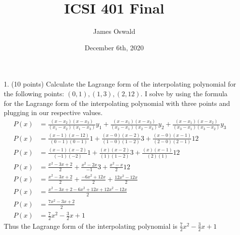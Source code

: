 \documentclass{article}
\author{James Oswald}
\date{December 6th, 2020}
\title{ICSI 401 Final}
\begin{document}
\maketitle
\thispagestyle{fancy}

\begin{enumerate}
    \item[1.] (10 points) Calculate the Lagrange form of the interpolating polynomial for the following points: $(0, 1),(1, 3),(2, 12)$.
    \newline
    \newline
    I solve by using the formula for the Lagrange form of the interpolating polynomial with three points and plugging in our respective values.
    \begin{align*}
        P(x) &= \frac{(x-x_2)(x-x_3)}{(x_1-x_2)(x_1-x_3)}y_1 + \frac{(x-x_1)(x-x_3)}{(x_2-x_1)(x_2-x_3)}y_2 + \frac{(x-x_1)(x-x_2)}{(x_3-x_1)(x_3-x_2)}y_3 \\
        P(x) &= \frac{(x-1)(x-12)}{(0-1)(0-1)}1 + \frac{(x-0)(x-2)}{(1-0)(1-2)}3+ \frac{(x-0)(x-1)}{(2-0)(2-1)}12\\
        P(x) &= \frac{(x-1)(x-2)}{(-1)(-2)}1 + \frac{(x)(x-2)}{(1)(1-2)}3+ \frac{(x)(x-1)}{(2)(1)}12\\
        P(x) &= \frac{x^2-3x+2}{2} + \frac{x^2-2x}{-1}3+ \frac{x^2-x}{2}12 \\
        P(x) &= \frac{x^2-3x+2}{2} + \frac{-6x^2+12x}{2}+ \frac{12x^2-12x}{2}\\
        P(x) &= \frac{x^2-3x+2-6x^2+12x+12x^2-12x}{2}\\
        P(x) &= \frac{7x^2-3x+2}{2}\\
        P(x) &= \frac{7}{2}x^2-\frac{3}{2}x+1
    \end{align*}
    Thus the Lagrange form of the interpolating polynomial is $\frac{7}{2}x^2-\frac{3}{2}x+1$
    

\end{enumerate}
\end{document}
